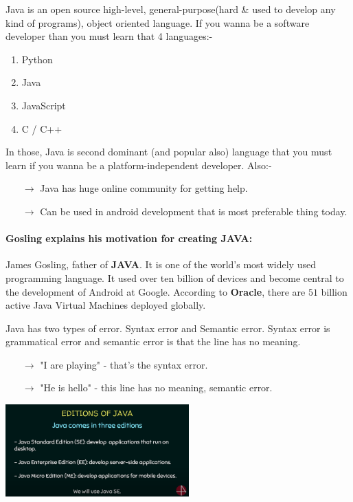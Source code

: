 Java is an open source high-level, general-purpose(hard \& used to develop any kind of programs), object oriented language. If you wanna be a software developer than you must learn that 4 languages:-
\begin{enumerate}
	\item Python
	\item Java
	\item JavaScript
	\item C / C++
\end{enumerate}
In those, Java is second dominant (and popular also) language that you must learn if you wanna be a platform-independent developer. Also:-
\begin{itemize}
	\item[$\rightarrow$] Java has huge online community for getting help.
	\item[$\rightarrow$] Can be used in android development that is most preferable thing today.
\end{itemize}

\paragraph{Gosling explains his motivation for creating \textbf{JAVA}:}
James Gosling, father of \textbf{JAVA}. It is one of the world's most widely used programming language. It used over ten billion of devices and become central to the development of Android at Google. According to \textbf{Oracle}, there are $51$ billion active Java Virtual Machines deployed globally.

Java has two types of error. Syntax error and Semantic error. Syntax error is grammatical error and semantic error is that the line has no meaning.
\begin{itemize}
	\item[$\rightarrow$] "I are playing" - that's the syntax error.
	\item[$\rightarrow$] "He is hello" - this line has no meaning, semantic error.
\end{itemize} %
\begin{center}
	\includegraphics[width=200pt]{Source Images/Editions of Java.png} 
\end{center}

